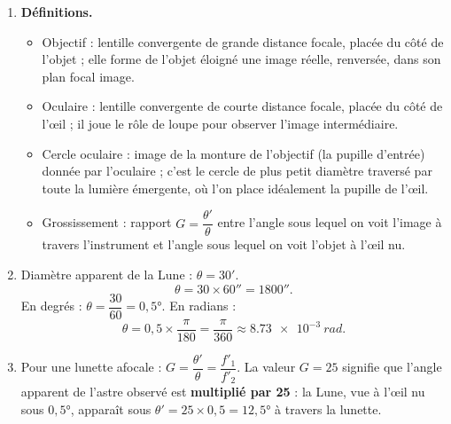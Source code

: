 \documentclass[11pt]{article}
\newcommand{\cle}[1]{{\popxbold\color{popdark}#1}}
\begin{document}
\begin{corrige}
\begin{enumerate}
\item \textbf{Définitions.}
\begin{itemize}
\item \cle{Objectif} : lentille convergente de grande distance focale, placée du côté de l'objet ; elle forme de l'objet éloigné une image réelle, renversée, dans son plan focal image.
\item \cle{Oculaire} : lentille convergente de courte distance focale, placée du côté de l'œil ; il joue le rôle de loupe pour observer l'image intermédiaire.
\item \cle{Cercle oculaire} : image de la monture de l'objectif (la pupille d'entrée) donnée par l'oculaire ; c'est le cercle de plus petit diamètre traversé par toute la lumière émergente, où l'on place idéalement la pupille de l'œil.
\item \cle{Grossissement} : rapport $G = \dfrac{\theta'}{\theta}$ entre l'angle sous lequel on voit l'image à travers l'instrument et l'angle sous lequel on voit l'objet à l'œil nu.
\end{itemize}
\item Diamètre apparent de la Lune : $\theta = 30'$.
\[ \theta = 30 \times 60'' = 1800''. \]
En degrés : $\theta = \dfrac{30}{60} = 0{,}5°$. En radians :
\[ \theta = 0{,}5 \times \dfrac{\pi}{180} = \dfrac{\pi}{360} \approx \SI{8,73e-3}{rad}. \]
\item Pour une lunette afocale : $G = \dfrac{\theta'}{\theta} = \dfrac{f'_1}{f'_2}$. La valeur $G = 25$ signifie que l'angle apparent de l'astre observé est \textbf{multiplié par 25} : la Lune, vue à l'œil nu sous $0{,}5°$, apparaît sous $\theta' = 25 \times 0{,}5 = 12{,}5°$ à travers la lunette.
\end{enumerate}
\end{corrige}
\end{document}
